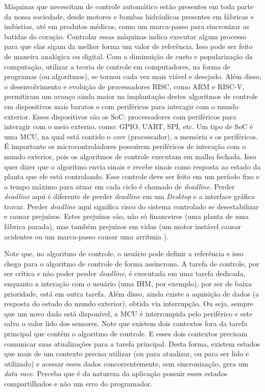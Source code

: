 Máquinas que necessitam de controle automático estão presentes em toda parte da nossa sociedade, desde motores e bombas hidráulicas presentes em fábricas e indústias, até em produtos médicos, como um marca-passo para sincronizar as batidas do coração. Controlar essas máquinas indica executar algum processo para que elas sigam da melhor forma um valor de referência. Isso pode ser feito de maneira analógica ou digital. Com a diminuição de custo e popularização da computação, utilizar a teoria de controle \citep{book:ogata} em computadores, na forma de programas (ou algoritmos), se tornou cada vez mais viável e desejado. Além disso, o desenvolvimento e evolução de processadores \ac{RISC}, como ARM e RISC-V, permitiram um avanço ainda maior na implantação destes algoritmos de controle em dispositivos mais baratos e com periféricos para interagir com o mundo exterior. Esses dispositivos são os \ac{SoC}: processadores com periféricos para interagir com o meio externo, como: \ac{GPIO}, \ac{UART}, \ac{SPI}, etc. Um tipo de \ac{SoC} é uma \ac{MCU}, na qual está contido o \textit{core} (processador), a memória e os periféricos. É importante os microcontroladores possuírem periféricos de interação com o mundo exterior, pois os algoritmos de controle executam em malha fechada. Isso quer dizer que o algoritmo envia sinais e recebe sinais como resposta ao estado da planta que ele está controlando. Esse controle deve ser feito em um período fixo e o tempo máximo para atuar em cada ciclo é chamado de \textit{deadline}. Perder \textit{deadline} aqui é diferente de perder \textit{deadline} em um \textit{Desktop} e a interface gráfica travar. Perder \textit{deadline} aqui significa risco do sistema controlado se desestabilizar e causar prejuízos. Estes prejuízos são, não só financeiros (uma planta de uma fábrica parada), mas também prejuízos em vidas (um motor instável causar acidentes ou um marca-passo causar uma arritmia \citep{article:liu-layland-hard-real-time}).

Note que, no algoritmo de controle, o usuário pode definir a referência e isso chega para o algoritmo de controle de forma assíncrona. A tarefa de controle, por ser crítica e não poder perder \textit{deadline}, é executada em uma tarefa dedicada, enquanto a interação com o usuário (uma \ac{IHM}, por exemplo), por ser de baixa prioridade, está em outra tarefa. Além disso, ainda existe a aquisição de dados (a resposta do estado do mundo exterior), obtida via interrupção. Ou seja, sempre que um novo dado está disponível, a \ac{MCU} é interrompida pelo periférico e este salva o valor lido dos sensores. Note que existem dois contextos fora da tarefa principal que contém o algoritmo de controle. E esses dois contextos precisam comunicar suas atualizações para a tarefa principal. Desta forma, existem estados que mais de um contexto precisa utilizar (ou para atualizar, ou para ser lido e utilizado) e acessar esses dados concorrentemente, sem sincronização, gera um \textit{data race}. Perceba que é da natureza da aplicação possuir esses estados compartilhados e não um erro do programador.

